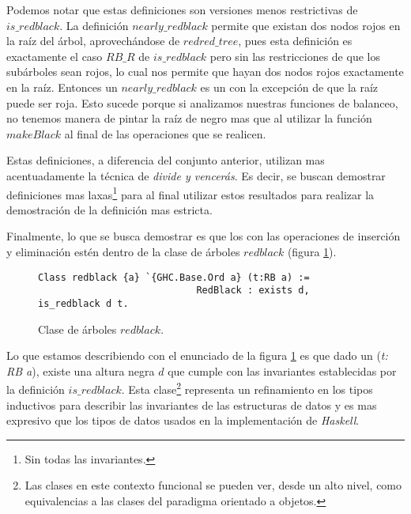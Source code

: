 Podemos notar que estas definiciones son versiones menos restrictivas de 
\hyperref[inductive_isRedB]{$is\_redblack$}. La definici\'on 
\hyperref[inductive_isRedB]{$nearly\_redblack$} permite que existan dos nodos rojos en la ra\'iz del 
\'arbol, aprovech\'andose de \hyperref[inductive_isRedB]{$redred\_tree$}, pues esta definici\'on es 
exactamente el caso $RB\_R$ de \hyperref[inductive_isRedB]{$is\_redblack$} pero sin las 
restricciones de que los sub\'arboles sean rojos, lo cual nos permite que hayan dos nodos rojos 
exactamente en la ra\'iz. Entonces un \hyperref[inductive_isRedB]{$nearly\_redblack$} es un {\arn} 
con la excepci\'on de que la ra\'iz puede ser roja. Esto sucede porque si analizamos nuestras funciones de 
balanceo, no tenemos manera de pintar la raíz de negro mas que al utilizar la función 
\hyperref[raiz_negra_func]{$makeBlack$} al final de las operaciones que se realicen. 

Estas definiciones, a diferencia del conjunto anterior, utilizan mas acentuadamente la t\'ecnica de 
\textit{divide y vencerás}. Es decir, se buscan demostrar definiciones mas laxas\footnote{Sin todas 
las invariantes.} para al final utilizar estos resultados para realizar la demostraci\'on de la 
definición mas estricta.

Finalmente, lo que se busca demostrar es que los {\arns} con las operaciones de inserci\'on y
eliminaci\'on est\'en dentro de la clase de \'arboles $redblack$ (figura \ref{class_rb}).

\begin{figure}[!ht]
\centering
\captionsetup{justification=centering}
\begin{verbatim}
Class redblack {a} `{GHC.Base.Ord a} (t:RB a) :=
                            RedBlack : exists d, is_redblack d t.
\end{verbatim}
\caption{Clase de \'arboles $redblack$.}
\label{class_rb}
\end{figure}

Lo que estamos describiendo con el enunciado de la figura \ref{class_rb} es que dado un {\arn} 
(\textit{t: RB a}), existe una altura negra $d$ que cumple con las invariantes establecidas por la 
definici\'on \hyperref[inductive_isRedB]{$is\_redblack$}. Esta clase\footnote{Las clases en este 
contexto funcional se pueden ver, desde un alto nivel, como equivalencias a las clases del paradigma 
orientado a objetos.} representa un refinamiento en los tipos inductivos para describir las 
invariantes de las estructuras de datos y es mas expresivo que los tipos de datos usados en la 
implementaci\'on de \textit{Haskell}.

